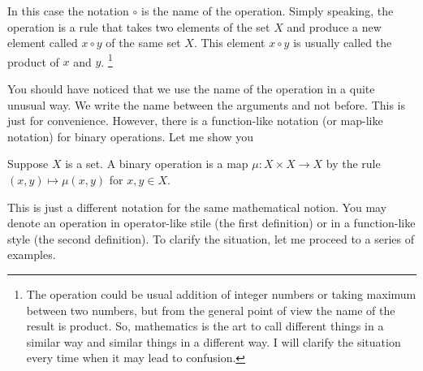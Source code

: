 In this case the notation $\circ$ is the name of the operation.
Simply speaking, the operation is a rule that takes two elements of the set $X$ and produce a new element called $x\circ y$ of the same set $X$.
This element $x\circ y$ is usually called the product of $x$ and $y$.%
\footnote{The operation could be usual addition of integer numbers or taking maximum between two numbers, but from the general point of view the name of the result is product.
So, mathematics is the art to call different things in a similar way and similar things in a different way.
I will clarify the situation every time when it may lead to confusion.}

You should have noticed that we use the name of the operation in a quite unusual way.
We write the name between the arguments and not before.
This is just for convenience.
However, there is a function-like notation (or map-like notation) for binary operations.
Let me show you

\begin{definition}
Suppose $X$ is a set.
A binary operation is a map $\mu\colon X\times X\to X$ by the rule $(x, y)\mapsto \mu(x, y)$ for $x, y\in X$.
\end{definition}

This is just a different notation for the same mathematical notion.
You may denote an operation in operator-like stile (the first definition) or in a function-like style (the second definition).
To clarify the situation, let me proceed to a series of examples.

